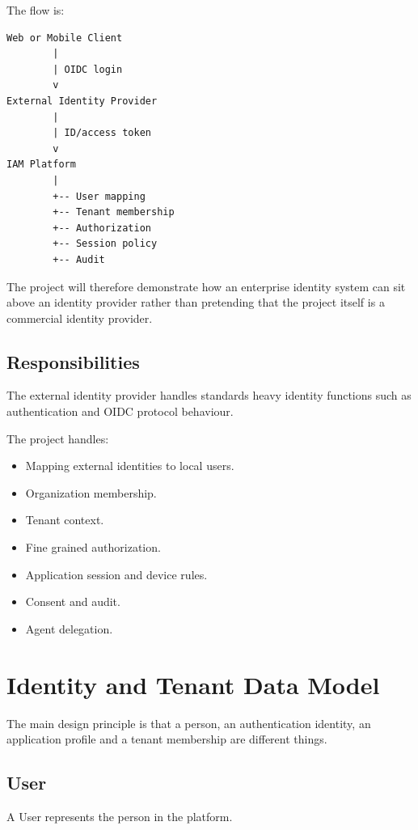 \documentclass[11pt,a4paper]{article}
\begin{document}
The flow is:

\begin{verbatim}
Web or Mobile Client
        |
        | OIDC login
        v
External Identity Provider
        |
        | ID/access token
        v
IAM Platform
        |
        +-- User mapping
        +-- Tenant membership
        +-- Authorization
        +-- Session policy
        +-- Audit
\end{verbatim}

The project will therefore demonstrate how an enterprise identity system can sit above an identity provider rather than pretending that the project itself is a commercial identity provider.

\subsection{Responsibilities}

The external identity provider handles standards heavy identity functions such as authentication and OIDC protocol behaviour.

The project handles:

\begin{itemize}
    \item Mapping external identities to local users.
    \item Organization membership.
    \item Tenant context.
    \item Fine grained authorization.
    \item Application session and device rules.
    \item Consent and audit.
    \item Agent delegation.
\end{itemize}

\section{Identity and Tenant Data Model}

The main design principle is that a person, an authentication identity, an application profile and a tenant membership are different things.

\subsection{User}

A User represents the person in the platform.
\end{document}
